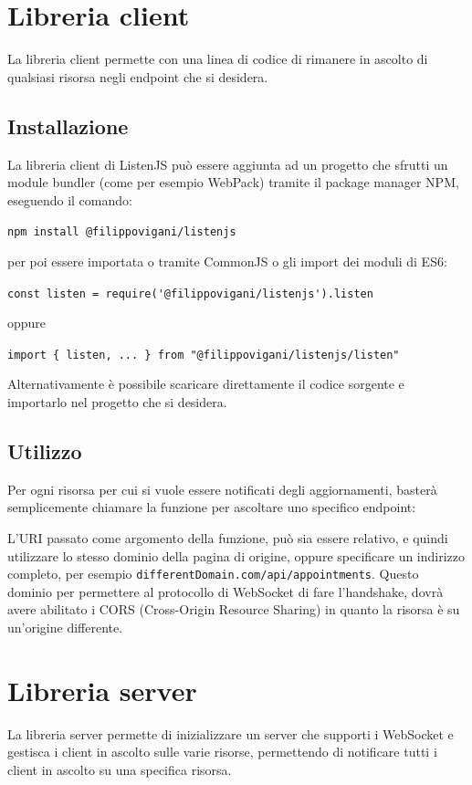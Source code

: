 \documentclass[12pt,a4paper,openright,twoside]{report}
\begin{document}
\section{Libreria client}
La libreria client permette con una linea di codice di rimanere in ascolto di qualsiasi risorsa negli endpoint che si desidera.

\subsection{Installazione}
La libreria client di ListenJS può essere aggiunta ad un progetto che sfrutti un module bundler (come per esempio WebPack) tramite il package manager NPM, eseguendo il comando:
\begin{center}
\lstinline{npm install @filippovigani/listenjs}
\end{center}
per poi essere importata o tramite CommonJS o gli import dei moduli di ES6:
\begin{center}
\lstinline{const listen = require('@filippovigani/listenjs').listen}
\end{center}
oppure
\begin{center}
\lstinline|import { listen, ... } from "@filippovigani/listenjs/listen"|
\end{center}  
Alternativamente è possibile scaricare direttamente il codice sorgente\cite{listenjs_repo} e importarlo nel progetto che si desidera.

\subsection{Utilizzo}
Per ogni risorsa per cui si vuole essere notificati degli aggiornamenti, basterà semplicemente chiamare la funzione per ascoltare uno specifico endpoint:

L'URI passato come argomento della funzione, può sia essere relativo, e quindi utilizzare lo stesso dominio della pagina di origine, oppure specificare un indirizzo completo, per esempio \lstinline{differentDomain.com/api/appointments}. Questo dominio per permettere al protocollo di WebSocket di fare l'handshake, dovrà avere abilitato i CORS (Cross-Origin Resource Sharing) in quanto la risorsa è su un'origine differente.

\section{Libreria server}
La libreria server permette di inizializzare un server che supporti i WebSocket e gestisca i client in ascolto sulle varie risorse, permettendo di notificare tutti i client in ascolto su una specifica risorsa. 
\end{document}
